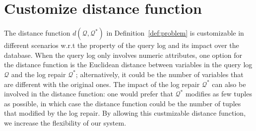 \section{Customize distance function}
The distance function $d(\mathcal{Q}, \mathcal{Q}^*)$ 
in Definition~\ref{def:problem} is customizable 
in different scenarios w.r.t the property of the query log and its
impact over the database. 
When the query log only involves numeric attributes, one option for 
the distance function is the Euclidean distance between variables in 
the query log $\mathcal{Q}$ and the log repair $\mathcal{Q}^*$; 
alternatively, it could be the number of 
variables that are different with the original ones. The
impact of the log repair $\mathcal{Q}^*$ can also be involved 
in the distance function: one would prefer that $\mathcal{Q}^*$
modifies as few tuples as possible, in which case the distance 
function could be the number of tuples that modified by the log repair.
By allowing this custmizable distance function, we increase the flexibility 
of our system.